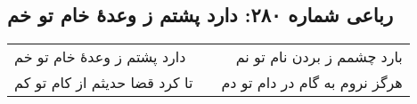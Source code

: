 \begin{center}
\section*{رباعی شماره ۲۸۰: دارد پشتم ز وعدهٔ خام تو خم}
\label{sec:sh280}
\begin{longtable}{l p{0.5cm} r}
دارد پشتم ز وعدهٔ خام تو خم
&&
بارد چشمم ز بردن نام تو نم
\\
تا کرد قضا حدیثم از کام تو کم
&&
هرگز نروم به گام در دام تو دم
\\
\end{longtable}
\end{center}
